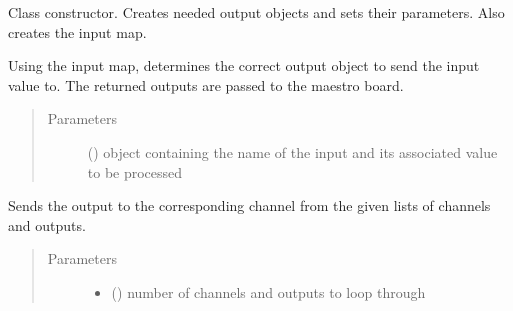 \documentclass[letterpaper,10pt,english]{sphinxmanual}
\begin{document}
\begin{fulllineitems}
\begin{fulllineitems}
\label{\detokenize{movementmap:MovementMap.MovementMap.__init__}}
\sphinxAtStartPar
Class constructor. Creates needed output objects and sets their parameters. Also 
creates the input map.

\end{fulllineitems}


\begin{fulllineitems}
\label{\detokenize{movementmap:MovementMap.MovementMap.process_input}}
\sphinxAtStartPar
Using the input map, determines the correct output object to send the input value to. 
The returned outputs are passed to the maestro board.
\begin{quote}\begin{description}
\item[{Parameters}] \leavevmode
\sphinxAtStartPar
{} ({\hyperref[\detokenize{manualcontrol:manualControl.ControllerEvent}]{}}) \textendash{} object containing the name of the input and its associated value 
to be processed

\end{description}\end{quote}

\end{fulllineitems}


\begin{fulllineitems}
\label{\detokenize{movementmap:MovementMap.MovementMap.send_outputs}}
\sphinxAtStartPar
Sends the output to the corresponding channel from the given lists of channels and
outputs.
\begin{quote}\begin{description}
\item[{Parameters}] \leavevmode\begin{itemize}
\item {} 
\sphinxAtStartPar
{} () \textendash{} number of channels and outputs to loop through


\end{itemize}
\end{description}
\end{quote}
\end{fulllineitems}
\end{fulllineitems}
\end{document}
